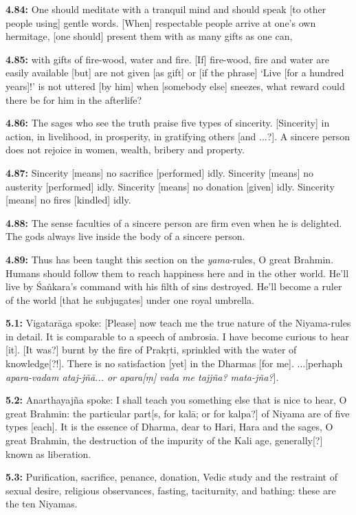 \documentclass{article}
\newcommand{\vsnum}[1]{\textbf{#1}}
\newcommand{\skt}[1]{\textit{#1}}
\begin{document}
\vsnum{4.84: }One should meditate with a tranquil mind and should speak [to other people using] gentle words. [When] respectable people arrive at one's own hermitage, [one should] present them with as many gifts as one can,

\vsnum{4.85: }with gifts of fire-wood, water and fire. [If] fire-wood, fire and water are easily available [but] are not given [as gift] or [if the phrase] `Live [for a hundred years]!' is not uttered [by him] when [somebody else] sneezes, what reward could there be for him in the afterlife?

\vsnum{4.86: }The sages who see the truth praise five types of sincerity. [Sincerity] in action, in livelihood, in prosperity, in gratifying others [and ...?]. A sincere person does not rejoice in women, wealth, bribery and property.

\vsnum{4.87: }Sincerity [means] no sacrifice [performed] idly. Sincerity [means] no austerity [performed] idly. Sincerity [means] no donation [given] idly. Sincerity [means] no fires [kindled] idly.

\vsnum{4.88: }The sense faculties of a sincere person are firm even when he is delighted. The gods always live inside the body of a sincere person.

\vsnum{4.89: }Thus has been taught this section on the \skt{yama}-rules, O great Brahmin. Humans should follow them to reach happiness here and in the other world. He'll live by Śaṅkara's command with his filth of sins destroyed. He'll become a ruler of the world [that he subjugates] under one royal umbrella.


\vsnum{5.1: }Vigatarāga spoke: [Please] now teach me the true nature of the Niyama-rules in detail. It is comparable to a speech of ambrosia. I have become curious to hear [it]. [It was?] burnt by the fire of Prakṛti, sprinkled with the water of knowledge[?!]. There is no satisfaction [yet] in the Dharmas [for me]. ...[perhaph \skt{apara-vadam ataj-jñā... or apara[ṃ] vada me tajjña? mata-jña?}].

\vsnum{5.2: }Anarthayajña spoke: I shall teach you something else that is nice to hear, O great Brahmin: the particular part[s, for kalā; or for kalpa?] of Niyama are of five types [each]. It is the essence of Dharma, dear to Hari, Hara and the sages, O great Brahmin, the destruction of the impurity of the Kali age, generally[?] known as liberation.

\vsnum{5.3: }Purification, sacrifice, penance, donation, Vedic study and the restraint of sexual desire, religious observances, fasting, taciturnity, and bathing: these are the ten Niyamas.
\end{document}
